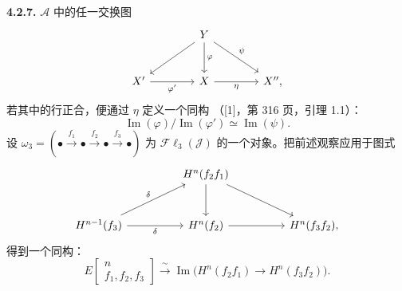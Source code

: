 \medskip\noindent\textbf{4.2.7.}
$\mathcal A$ 中的任一交换图
\[
\begin{tikzcd}[column sep=4em,row sep=2.7em]
&Y\arrow[dl]\arrow[d,"\varphi"]\arrow[dr,"\psi"]&\\
X'\arrow[r,"\varphi'"']&X\arrow[r,"\eta"']&X'',
\end{tikzcd}
\]
若其中的行正合，便通过 $\eta$ 定义一个同构
（[1]，第 316 页，引理 1.1）：
\[
\operatorname{Im}(\varphi)\big/\operatorname{Im}(\varphi')
\simeq\operatorname{Im}(\psi).
\]
设
$\omega_3=(\mathord\bullet\xrightarrow{f_1}\mathord\bullet
\xrightarrow{f_2}\mathord\bullet\xrightarrow{f_3}\mathord\bullet)$
为 $\mathcal{F}\ell_3(\mathcal J)$ 的一个对象。把前述观察应用于图式
\[
\begin{tikzcd}[column sep=4.6em,row sep=2.8em]
&H^n(f_2f_1)\arrow[d]\arrow[dr]&\\
H^{n-1}(f_3)\arrow[ur,"\delta"]\arrow[r,"\delta"']&
H^n(f_2)\arrow[r]&H^n(f_3f_2),
\end{tikzcd}
\]
得到一个同构：
\[
E\!\begin{bmatrix}n\\ f_1,f_2,f_3\end{bmatrix}
\xrightarrow{\ \sim\ }
\operatorname{Im}\bigl(H^n(f_2f_1)\longrightarrow H^n(f_3f_2)\bigr).
\tag{4.2.7.1}
\]
\endgroup
